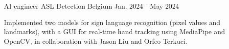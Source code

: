 \begin{cventries}


  \cventry
    {AI engineer} %
    {ASL Detection} %
    {Belgium} %
    {Jan. 2024 ‑ May 2024} %
    {
      \begin{cvitems} %
        \item {Implemented two models for sign language recognition (pixel values and landmarks), with a GUI for real-time hand tracking using MediaPipe and OpenCV, in collaboration with Jason Liu and Orfeo Terkuci.}
      \end{cvitems}
    }



\end{cventries}
